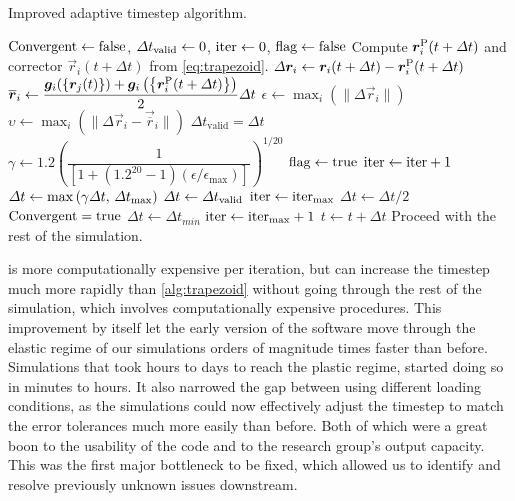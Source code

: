 \begin{algorithm}
    \caption{Improved adaptive timestep algorithm.}
    \label{alg:trapezoid_improved}
    \begin{algorithmic}
        \State $\textrm{Convergent} \gets \textrm{false}$, $\Delta t_{\textrm{valid}} \gets 0$, $\textrm{iter} \gets 0$, $\textrm{flag} \gets \textrm{false}$
        \State Compute $\vec{r}_i^{\rvar{P}}(t + \Delta t)$ and corrector $\vec{r}_i(t + \Delta t)$ from \cref{eq:trapezoid}.
        \State $\Delta \vec{r}_i \gets \vec{r}_i(t + \Delta t) - \vec{r}_i^{\rvar{P}}(t + \Delta t)$
        \State $\vec{\overline{r}}_i \gets \dfrac{\vec{g}_i(\left\{\vec{r}_j(t)\right\}) + \vec{g}_i\left(\left\{\vec{r}_i^{\rvar{P}}(t + \Delta t)\right\}\right)}{2}\Delta t$
        \State $\epsilon \gets \max_i\left(\lVert \Delta \vec{r}_i \rVert \right)$
        \State $\upsilon \gets \max_i\left(\lVert \Delta \vec{r}_i - \vec{\overline{r}}_i \rVert\right)$
        \State $\Delta t_{\textrm{valid}} = \Delta t$
        \State $\gamma \gets 1.2\left(\dfrac{1}{\left[1 + (1.2^{20} - 1) (\epsilon / \epsilon_{\textrm{max}})\right]}\right)^{1/20}$
        \State $\textrm{flag} \gets \textrm{true}$
        \State $\textrm{iter} \gets \textrm{iter} + 1$
        \State $\Delta t \gets \max\left(\gamma \Delta t,\, \Delta t_{\textrm{max}}\right)$
        \Else
        \State $\Delta t \gets \Delta t_{\textrm{valid}}$
        \State $\textrm{iter} \gets \textrm{iter}_{\textrm{max}}$
        \Else
        \State $\Delta t \gets \Delta t / 2$
        \EndIf
        \EndIf
        \State $\textrm{Convergent} = \textrm{true}$
        \EndIf
        \State $\Delta t \gets \Delta t_{min}$
        \State $\textrm{iter} \gets \textrm{iter}_{\textrm{max}} + 1$
        \EndIf
        \EndWhile
        \State $t \gets t + \Delta t$
        \State Proceed with the rest of the simulation.
    \end{algorithmic}
\end{algorithm}

 is more computationally expensive per iteration, but can increase the timestep much more rapidly than \cref{alg:trapezoid} without going through the rest of the simulation, which involves computationally expensive procedures. This improvement by itself let the early version of the software move through the elastic regime of our simulations orders of magnitude times faster than before. Simulations that took hours to days to reach the plastic regime, started doing so in minutes to hours. It also narrowed the gap between using different loading conditions, as the simulations could now effectively adjust the timestep to match the error tolerances much more easily than before. Both of which were a great boon to the usability of the code and to the research group's output capacity. This was the first major bottleneck to be fixed, which allowed us to identify and resolve previously unknown issues downstream.

